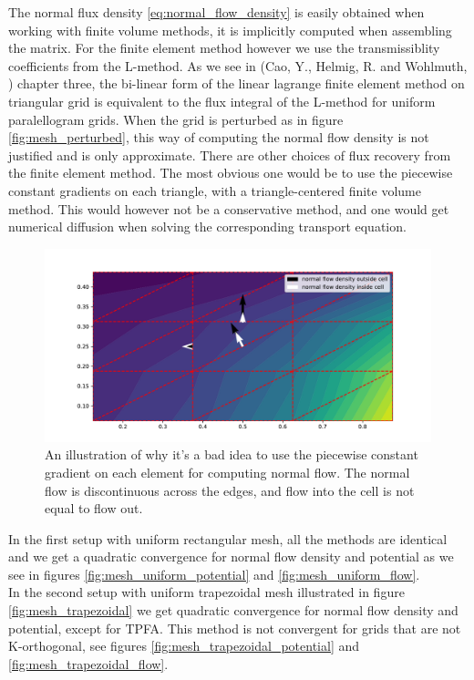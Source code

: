 \documentclass[../Main/main.tex]{subfiles}
\begin{document}
		The normal flux density \eqref{eq:normal_flow_density} is easily obtained when working with finite volume methods, it is implicitly computed when assembling the matrix.
		For the finite element method however we use the transmissiblity coefficients from the L-method. As we see in (Cao, Y., Helmig, R. and Wohlmuth, \cite{https://doi.org/10.1002/num.20525}) chapter three, the bi-linear form of the linear lagrange finite element method on triangular grid is equivalent to the flux integral of the L-method for uniform paralellogram grids. When the grid is perturbed as in figure \ref{fig:mesh_perturbed}, this way of computing the normal flow density is not justified and is only approximate. There are other choices of flux recovery from the finite element method. The most obvious one would be to use the piecewise constant gradients on each triangle, with a triangle-centered finite volume method. This would however not be a conservative method, and one would get numerical diffusion when solving the corresponding transport equation.\\
		\begin{figure}
			\label{fig:fem_flux}
			\includegraphics[width=1\textwidth]{fem_flux.pdf}
			\caption{An illustration of why it's a bad idea to use the piecewise constant gradient on each element for computing normal flow. The normal flow is discontinuous across the edges, and flow into the cell is not equal to flow out.}
		\end{figure}
		In the first setup with uniform rectangular mesh, all the methods are identical and we get a quadratic convergence for normal flow density and potential as we see in figures \ref{fig:mesh_uniform_potential} and \ref{fig:mesh_uniform_flow}.\\
		In the second setup with uniform trapezoidal mesh illustrated in figure \ref{fig:mesh_trapezoidal} we get quadratic convergence for normal flow density and potential, except for TPFA. This method is  not convergent for grids that are not K-orthogonal, see figures \ref{fig:mesh_trapezoidal_potential} and \ref{fig:mesh_trapezoidal_flow}.\\
\end{document}
